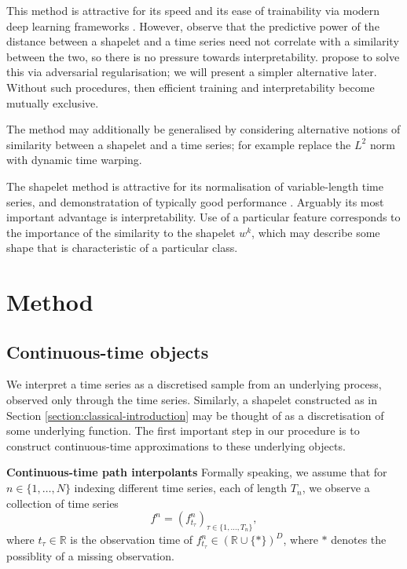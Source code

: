 \documentclass{article}
\theoremstyle{plain}
\theoremstyle{definition}
\newcommand{\reals}{\mathbb{R}}
\newcommand{\boldheading}[1]{

\textbf{#1}\quad}
\begin{document}
	This method is attractive for its speed and its ease of trainability via modern deep learning frameworks \cite{tensorflow, pytorch, jax}. However, \cite{wang2019interp} observe that the predictive power of the distance between a shapelet and a time series need not correlate with a similarity between the two, so there is no pressure towards interpretability. \cite{wang2019interp} propose to solve this via adversarial regularisation; we will present a simpler alternative later. Without such procedures, then efficient training and interpretability become mutually exclusive.
	
	The method may additionally be generalised by considering alternative notions of similarity between a shapelet and a time series; for example \cite{grabocka2016dtwshapelet} replace the $L^2$ norm with dynamic time warping.
	
	The shapelet method is attractive for its normalisation of variable-length time series, and demonstratation of typically good performance \cite{bagnall2016bakeoff, bostrom2015shapelet}. Arguably its most important advantage is interpretability. Use of a particular feature corresponds to the importance of the similarity to the shapelet $w^{k}$, which may describe some shape that is characteristic of a particular class.
	
	\section{Method}
	\subsection{Continuous-time objects}
	We interpret a time series as a discretised sample from an underlying process, observed only through the time series. Similarly, a shapelet constructed as in Section \ref{section:classical-introduction} may be thought of as a discretisation of some underlying function. The first important step in our procedure is to construct continuous-time approximations to these underlying objects.
	
	\boldheading{Continuous-time path interpolants}
	Formally speaking, we assume that for $n \in \{1, \ldots, N\}$ indexing different time series, each of length $T_n$, we observe a collection of time series
	\begin{equation*}
	f^n = (f^n_{t_\tau})_{\tau \in \{1, \ldots, T_n\}},
	\end{equation*}
	where $t_\tau \in \reals$ is the observation time of $f^n_{t_\tau} \in (\reals \cup \{*\})^D$, where $*$ denotes the possiblity of a missing observation.%
	
\end{document}
